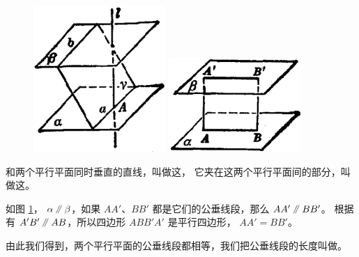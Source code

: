 \begin{figure}[htbp]
    \centering
    \begin{minipage}[b]{7cm}
        \centering
        \includegraphics[width=5cm]{../pic/ltjh-ch1-42.png}
        \caption{}\label{fig:ltjh-1-42}
    \end{minipage}
    \qquad
    \begin{minipage}[b]{7cm}
        \centering
        \includegraphics[width=5cm]{../pic/ltjh-ch1-43.png}
        \caption{}\label{fig:ltjh-1-43}
    \end{minipage}
\end{figure}

和两个平行平面同时垂直的直线，叫做这，
它夹在这两个平行平面间的部分，叫做这。

如图 \ref{fig:ltjh-1-43}， $\alpha \pingxing \beta$，如果 $AA'$、$BB'$ 都是它们的公垂线段，那么 $AA' \pingxing BB'$。
根据有 $A'B' \pingxing AB$，所以四边形 $ABB'A'$ 是平行四边形， $AA' = BB'$。

由此我们得到，两个平行平面的公垂线段都相等，我们把公垂线段的长度叫做。


\begin{lianxi}


\begin{xiaoxiaotis}



\end{xiaoxiaotis}


\end{lianxi}

